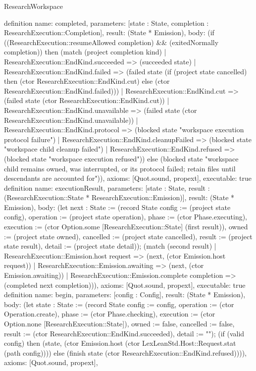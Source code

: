 \begin{lexlean}{ResearchWorkspace}
\begin{semanticmodule}
definition{
 name: completed,
 parameters: [state : State, completion : ResearchExecution::Completion],
 result: (State * Emission),
 body: (if ((ResearchExecution::resumeAllowed completion) && (exitedNormally completion)) then (match (project completion kind)
 | ResearchExecution::EndKind.succeeded => (succeeded state)
 | ResearchExecution::EndKind.failed => (failed state (if (project state cancelled) then (ctor ResearchExecution::EndKind.cut) else (ctor ResearchExecution::EndKind.failed)))
 | ResearchExecution::EndKind.cut => (failed state (ctor ResearchExecution::EndKind.cut))
 | ResearchExecution::EndKind.unavailable => (failed state (ctor ResearchExecution::EndKind.unavailable))
 | ResearchExecution::EndKind.protocol => (blocked state "workspace execution protocol failure")
 | ResearchExecution::EndKind.cleanupFailed => (blocked state "workspace child cleanup failed")
 | ResearchExecution::EndKind.refused => (blocked state "workspace execution refused")) else (blocked state "workspace child remains owned, was interrupted, or its protocol failed; retain files until descendants are accounted for")),
 axioms: [Quot.sound, propext],
 executable: true
}
definition{
 name: executionResult,
 parameters: [state : State, result : (ResearchExecution::State * ResearchExecution::Emission)],
 result: (State * Emission),
 body: (let next : State := (record State {config := (project state config), operation := (project state operation), phase := (ctor Phase.executing), execution := (ctor Option.some [ResearchExecution::State] (first result)), owned := (project state owned), cancelled := (project state cancelled), result := (project state result), detail := (project state detail)}); (match (second result) | ResearchExecution::Emission.host request => (next, (ctor Emission.host request)) | ResearchExecution::Emission.awaiting => (next, (ctor Emission.awaiting)) | ResearchExecution::Emission.complete completion => (completed next completion))),
 axioms: [Quot.sound, propext],
 executable: true
}
definition{
 name: begin,
 parameters: [config : Config],
 result: (State * Emission),
 body: (let state : State := (record State {config := config, operation := (ctor Operation.create), phase := (ctor Phase.checking), execution := (ctor Option.none [ResearchExecution::State]), owned := false, cancelled := false, result := (ctor ResearchExecution::EndKind.succeeded), detail := ""}); (if (valid config) then (state, (ctor Emission.host (ctor LexLeanStd.Host::Request.stat (path config)))) else (finish state (ctor ResearchExecution::EndKind.refused)))),
 axioms: [Quot.sound, propext],
}
\end{semanticmodule}
\end{lexlean}
